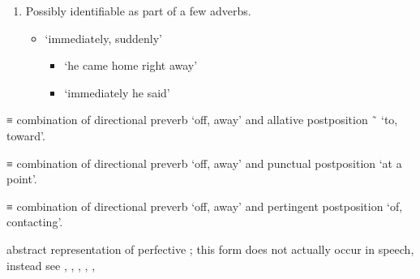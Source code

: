 \begin{morphdesc}[resume*=alphalist]
\begin{enumerate}
			or nonverbal predication.
		\begin{itemize}
		\item	
		\end{itemize}
	\item	Possibly identifiable as part of a few adverbs.
		\begin{itemize}
		\item	{} ‘immediately, suddenly’
			\begin{itemize}
			\item	{} ‘he came home right away’
				\parencite[58]{naish:1966}
			\item	{} ‘immediately he said’
				\parencite[133]{naish:1966}
			\end{itemize}
		\end{itemize}
	\end{enumerate}

\item[yóode=]\label{m:yóode=}
	≡  combination of directional preverb  ‘off, away’
		and allative postposition  \~\  ‘to, toward’.

\item[yóot=]\label{m:yóot=}
	≡  combination of directional preverb  ‘off, away’
		and punctual postposition  ‘at a point’.

\item[yóox̱=]\label{m:yóox̱=}
	≡  combination of directional preverb  ‘off, away’
		and pertingent postposition  ‘of, contacting’.

\item[ÿu-]\label{m:ÿu-} 
	abstract representation of perfective ;
	this form does not actually occur in speech, instead see
		, , ,  , , 


\end{morphdesc}

